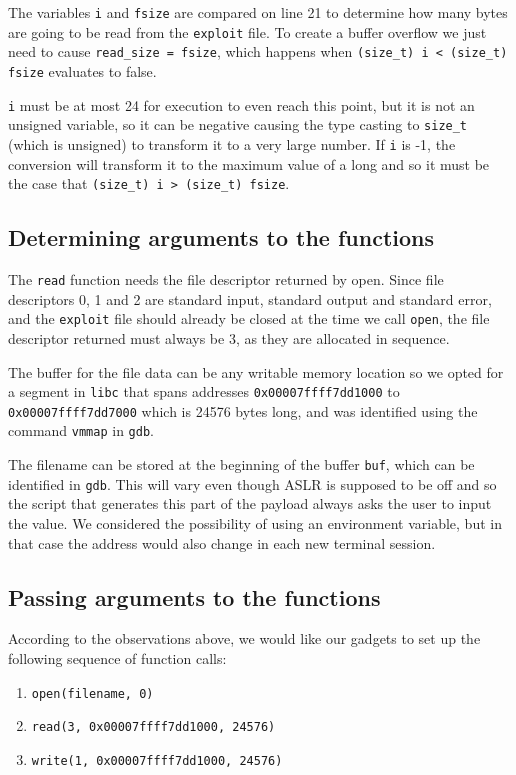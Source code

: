 \documentclass[12pt]{article}
\begin{document}
The variables \texttt{i} and \texttt{fsize} are compared on line 21 to determine how many bytes are going to be read from the \texttt{exploit} file. To create a buffer overflow we just need to cause \texttt{read\_size = fsize}, which happens when \texttt{(size\_t) i < (size\_t) fsize} evaluates to false.

\texttt{i} must be at most 24 for execution to even reach this point, but it is not an unsigned variable, so it can be negative causing the type casting to \texttt{size\_t} (which is unsigned) to transform it to a very large number. If \texttt{i} is -1, the conversion will transform it to the maximum value of a long and so it must be the case that \texttt{(size\_t) i > (size\_t) fsize}.

\subsection{Determining arguments to the functions}

The \texttt{read} function needs the file descriptor returned by open. Since file descriptors 0, 1 and 2 are standard input, standard output and standard error, and the \texttt{exploit} file should already be closed at the time we call \texttt{open}, the file descriptor returned must always be 3, as they are allocated in sequence.

The buffer for the file data can be any writable memory location so we opted for a segment in \texttt{libc} that spans addresses \texttt{0x00007ffff7dd1000} to \texttt{0x00007ffff7dd7000}  which is 24576 bytes long, and was identified using the command \texttt{vmmap} in \texttt{gdb}.

The filename can be stored at the beginning of the buffer \texttt{buf}, which can be identified in \texttt{gdb}. This will vary even though ASLR is supposed to be off and so the script that generates this part of the payload always asks the user to input the value. We considered the possibility of using an environment variable, but in that case the address would also change in each new terminal session. 

\subsection{Passing arguments to the functions}

According to the observations above, we would like our gadgets to set up the following sequence of function calls:
\begin{enumerate}
    \itemsep0em
    \item \texttt{open(filename, 0)}
    \item \texttt{read(3, 0x00007ffff7dd1000, 24576)}
    \item \texttt{write(1, 0x00007ffff7dd1000, 24576)}
\end{enumerate}
\end{document}

